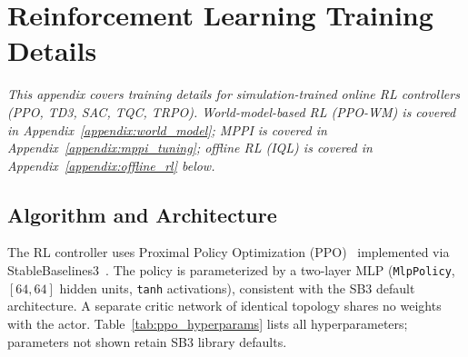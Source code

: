 \section{Reinforcement Learning Training Details}
\label{appendix:rl_training}

\noindent\textit{This appendix covers training details for simulation-trained online RL
controllers (PPO, TD3, SAC, TQC, TRPO). World-model-based RL
(PPO-WM) is covered in Appendix~\ref{appendix:world_model};
MPPI is covered in Appendix~\ref{appendix:mppi_tuning};
offline RL (IQL) is covered in Appendix~\ref{appendix:offline_rl} below.}

\subsection{Algorithm and Architecture}

The RL controller uses Proximal Policy Optimization
(PPO)~\cite{schulman2017proximal} implemented via
StableBaselines3~\cite{stable_baselines3}.
The policy is parameterized by a two-layer MLP (\texttt{MlpPolicy},
$[64, 64]$ hidden units, \texttt{tanh} activations), consistent with the
SB3 default architecture.
A separate critic network of identical topology shares no weights with
the actor.
Table~\ref{tab:ppo_hyperparams} lists all hyperparameters; parameters
not shown retain SB3 library defaults.

